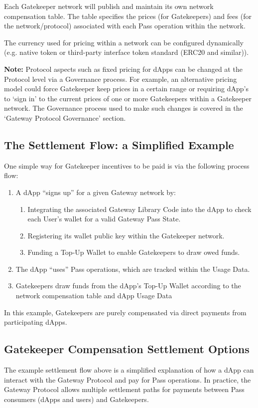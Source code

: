 Each Gatekeeper network will publish and maintain its own network compensation table. The table specifies the prices (for Gatekeepers) and fees (for the network/protocol) associated with each Pass operation within the network.

The currency used for pricing within a network can be configured dynamically (e.g. native token or third-party interface token standard (ERC20 and similar)).


\begin{tcolorbox}[width=\textwidth,colback={light-gray}]
\textbf{Note:} Protocol aspects such as fixed pricing for dApps can be changed at the Protocol level via a Governance process. For example, an alternative pricing model could force Gatekeeper keep prices in a certain range or requiring dApp's to ‘sign in’ to the current prices of one or more Gatekeepers within a Gatekeeper network. The Governance process used to make such changes is covered in the ‘Gateway Protocol Governance’ section.
\end{tcolorbox}

\subsection{The Settlement Flow: a Simplified Example}
One simple way for Gatekeeper incentives to be paid is via the following process flow:
\begin{enumerate}
\item A dApp “signs up” for a given Gateway network by:
\begin{enumerate}
\item Integrating the associated Gateway Library Code into the dApp to check each User’s wallet for a valid Gateway Pass State.
\item Registering its wallet public key within the Gatekeeper network.
\item Funding a Top-Up Wallet to enable Gatekeepers to draw owed funds.
\end{enumerate}
\item The dApp “uses” Pass operations, which are tracked within the Usage Data.
\item Gatekeepers draw funds from the dApp’s Top-Up Wallet according to the network compensation table and dApp Usage Data
\end{enumerate}
In this example, Gatekeepers are purely compensated via direct payments from participating dApps.

\subsection{Gatekeeper Compensation Settlement Options}
The example settlement flow above is a simplified explanation of how a dApp can interact with the Gateway Protocol and pay for Pass operations. In practice, the Gateway Protocol allows multiple settlement paths for payments between Pass consumers (dApps and users) and Gatekeepers.

